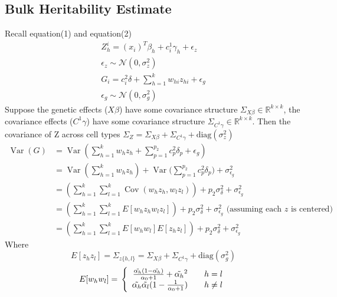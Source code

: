 \documentclass{article}
\DeclareMathOperator{\Var}{Var}
\DeclareMathOperator{\Cov}{Cov}
\begin{document}
\subsection{Bulk Heritability Estimate}
Recall equation(1) and equation(2)
\begin{gather*}
    Z^i_{h}=(x_i)^T\beta_{h}+c_i^1\gamma_{h}+\epsilon_z\\
    \epsilon_z \sim \mathcal{N}{(0,\sigma_z^2)}\\
    G_i=c^2_i\delta+\sum_{h=1}^{k}w_{hi}z_{hi}+\epsilon_{g}\\
    \epsilon_g \sim \mathcal{N}(0,\sigma_g^2)
\end{gather*}
Suppose the genetic effects ($X\beta$) have some covariance structure $\Sigma_{X\beta} \in \mathbb{R}^{k \times k}$, the covariance effects ($C^1\gamma$) have some covariance structure $\Sigma_{C^1\gamma} \in \mathbb{R}^{k \times k}$. Then the covariance of Z across cell types $\Sigma_{Z} = \Sigma_{X\beta} +\Sigma_{C^1\gamma}+ \text{diag}(\sigma^2_z)$
\begin{align}
    \Var(G) & = \Var(\sum_{h=1}^k w_{h}z_h +\sum_{p=1}^{p_2}c^2_p\delta_p + \epsilon_g) \nonumber\\
                  & = \Var(\sum_{h=1}^k w_{h}z_h) + \Var{(\sum_{p=1}^{p_2}c^2_p\delta_{p}}) + \sigma^2_{\epsilon_g} \nonumber\\
                  & = \left(\sum_{h = 1}^k\sum_{l=1}^k \Cov(w_hz_h,w_l z_l)\right) + p_2\sigma^2_{\delta} + \sigma^2_{\epsilon_g} \nonumber\\
                  & = \left(\sum_{h = 1}^k\sum_{l=1}^k E[w_h z_hw_lz_l]\right) + p_2\sigma^2_{\delta} + \sigma^2_{\epsilon_g} \text{ (assuming each $z$ is centered)}\nonumber\\
                  & = \left(\sum_{h = 1}^k\sum_{l=1}^k E[w_h w_l]E[z_hz_l]\right) + p_2\sigma^2_{\delta} + \sigma^2_{\epsilon_g}
\end{align}
Where
\begin{equation*}
    E[z_hz_l] = \Sigma_{z\{h,l\}} = \Sigma_{X\beta} + \Sigma_{C^1\gamma}+ \text{diag}(\sigma^2_g)
\end{equation*}
\begin{equation}
    E[w_h w_l] = \\
    \left\{
            \begin{array}{rcl}
             \frac{\tilde{\alpha_h}(1-\tilde{\alpha_h})}{\alpha_0 + 1} + \tilde{\alpha_h}^2 & &{h = l}\\
             \tilde{\alpha_h}\tilde{\alpha_l}(1-\frac{1}{\alpha_0 + 1}) & &{h\neq l}
             \end{array}
    \right.\nonumber
\end{equation}
\end{document}
